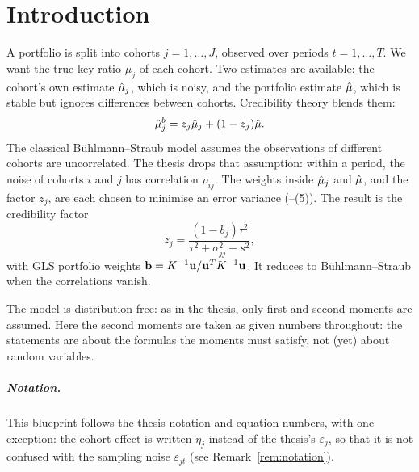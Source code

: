 \chapter*{Introduction}

A portfolio is split into cohorts $j = 1, \dots, J$, observed over periods
$t = 1, \dots, T$. We want the true key ratio $\mu_j$ of each cohort. Two
estimates are available: the cohort's own estimate $\hat\mu_j$, which is
noisy, and the portfolio estimate $\hat\mu$, which is stable but ignores
differences between cohorts. Credibility theory blends them:
\[
  \hat\mu_j^b = z_j \hat\mu_j + (1 - z_j)\hat\mu .
\]
The classical Bühlmann--Straub model assumes the observations of different
cohorts are uncorrelated. The thesis drops that assumption: within a
period, the noise of cohorts $i$ and $j$ has correlation $\rho_{ij}$. The
weights inside $\hat\mu_j$ and $\hat\mu$, and the factor $z_j$, are each chosen to
minimise an error variance (--(5)). The result is the credibility
factor
\[
  z_j = \frac{(1 - b_j)\tau^2}{\tau^2 + \sigma_{jj}^2 - s^2},
\]
with GLS portfolio weights $\mathbf{b} = K^{-1}\mathbf{u} / \mathbf{u}^T K^{-1} \mathbf{u}$. It reduces
to Bühlmann--Straub when the correlations vanish.

The model is distribution-free: as in the thesis, only first and second
moments are assumed. Here the second moments are taken as given numbers
throughout: the statements are about the formulas the moments must
satisfy, not (yet) about random variables.

\paragraph{Notation.} This blueprint follows the thesis notation and
equation numbers, with one exception: the cohort effect is written
$\eta_j$ instead of the thesis's $\varepsilon_j$, so that it is not
confused with the sampling noise $\varepsilon_{jt}$ (see
Remark~\ref{rem:notation}).


